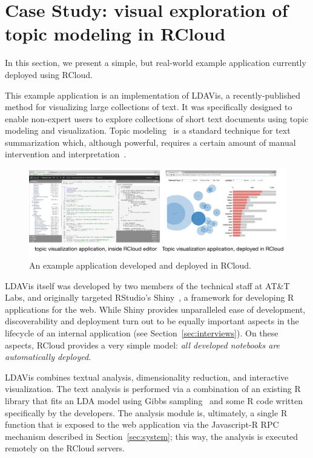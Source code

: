 \section{Case Study\label{sec:casestudy}: visual exploration of topic modeling in RCloud}

In this section, we present a simple, but real-world example
application currently deployed using RCloud.

This example application is an implementation of LDAVis, a
recently-published method for visualizing large collections of
text. It was specifically designed to enable non-expert users to
explore collections of short text documents using topic modeling and
visualization. Topic modeling~\cite{Blei:2003:LDA} is a standard
technique for text summarization which, although powerful, requires a
certain amount of manual intervention and
interpretation~\cite{Sievert:2014:LAM}.

\begin{figure}
  \includegraphics[width=\linewidth]{fig/casestudytext/casestudytext.pdf}
  \caption{\label{fig:textvis}An example application developed and deployed in RCloud.}
\end{figure}

LDAVis itself was developed by two members of the technical staff at
AT\&T Labs, and originally targeted RStudio's
Shiny~\cite{RStudio:2013:SWA}, a framework for developing R
applications for the web.  While Shiny provides unparalleled ease of
development, discoverability and deployment turn out to be equally
important aspects in the lifecycle of an internal application (see
Section~\ref{sec:interviews}).  On these aspects, RCloud provides a
very simple model: \emph{all developed notebooks are automatically
  deployed}.

LDAVis combines textual analysis, dimensionality reduction, and
interactive visualization. The text analysis is performed via a
combination of an existing R library that fits an LDA model using
Gibbs sampling~\cite{} and some R code written specifically by the
developers. The analysis module is, ultimately, a single R function
that is exposed to the web application via the Javascript-R RPC
mechanism described in Section~\ref{sec:system}; this way, the
analysis is executed remotely on the RCloud servers.

